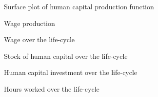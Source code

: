 \begin{frame}\begin{figure}[htp]\centering
\caption{Surface plot of human capital production function}
\end{figure}\end{frame}

\begin{frame}\begin{figure}[htp]\centering
\caption{Wage production}
\end{figure}\end{frame}

\begin{frame}\begin{figure}[htp]\centering
\caption{Wage over the life-cycle}
\end{figure}\end{frame}

\begin{frame}\begin{figure}[htp]\centering
\caption{Stock of human capital over the life-cycle}
\end{figure}\end{frame}

\begin{frame}\begin{figure}[htp]\centering
\caption{Human capital investment over the life-cycle}
\end{figure}\end{frame}

\begin{frame}\begin{figure}[htp]\centering
\caption{Hours worked over the life-cycle}
\end{figure}\end{frame}

